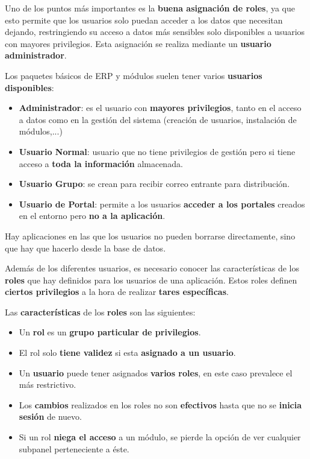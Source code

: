 Uno de los puntos más importantes es la \textbf{buena asignación de roles}, ya que esto permite que los usuarios solo puedan acceder a los datos que necesitan dejando, restringiendo su acceso a datos más sensibles solo disponibles a usuarios con mayores privilegios. Esta asignación se realiza mediante un \textbf{usuario administrador}.

Los paquetes básicos de ERP y módulos suelen tener varios \textbf{usuarios disponibles}:

\begin{itemize}
    \item \textbf{Administrador}: es el usuario con \textbf{mayores privilegios}, tanto en el acceso a datos como en la gestión del sistema (creación de usuarios, instalación de módulos,...)
    \item \textbf{Usuario Normal}: usuario que no tiene privilegios de gestión pero si tiene acceso a \textbf{toda la información} almacenada.
    \item \textbf{Usuario Grupo}: se crean para recibir correo entrante para distribución.
    \item \textbf{Usuario de Portal}: permite a los usuarios \textbf{acceder a los portales} creados en el entorno pero \textbf{no a la aplicación}.
\end{itemize}

Hay aplicaciones en las que los usuarios no pueden borrarse directamente, sino que hay que hacerlo desde la base de datos.

Además de los diferentes usuarios, es necesario conocer las características de los \textbf{roles} que hay definidos para los usuarios de una aplicación. Estos roles definen \textbf{ciertos privilegios} a la hora de realizar \textbf{tares específicas}.

Las \textbf{características} de los \textbf{roles} son las siguientes:

\begin{itemize}
    \item Un \textbf{rol} es un \textbf{grupo particular de privilegios}.
    \item El rol solo \textbf{tiene validez} si esta \textbf{asignado a un usuario}.
    \item Un \textbf{usuario} puede tener asignados \textbf{varios roles}, en este caso prevalece el más restrictivo.
    \item Los \textbf{cambios} realizados en los roles no son \textbf{efectivos} hasta que no se \textbf{inicia sesión} de nuevo.
    \item Si un rol \textbf{niega el acceso} a un módulo, se pierde la opción de ver cualquier subpanel perteneciente a éste.
\end{itemize}


